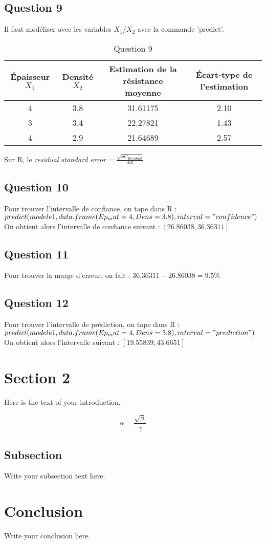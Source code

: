 \documentclass{article}
\begin{document}
\subsection{Question 9}
Il faut modéliser avec les variables \(X_{1}/X_{2}\) avec la commande 'predict'.
\begin{table}[!ht]
  \centering
  \footnotesize
  \begin{tabular}{cccc}\toprule
    \'Epaisseur $X_{1}$ & Densité $X_{2}$ & Estimation de la résistance moyenne & \'Ecart-type de l'estimation\\\midrule
    4 & 3.8 & 31.61175 & 2.10\\
    3 & 3.4 & 22.27821 & 1.43\\
    4 & 2.9 & 21.64689 & 2.57\\\bottomrule
  \end{tabular}
  \caption{Question 9}\label{tab:table}
\end{table}\newline
Sur R, le \textit{residual standard error} = $\frac{\sqrt{SC_{Residual}}}{ddl}$
\subsection{Question 10}
Pour trouver l'intervalle de confiance, on tape dans R :\newline
\textit{$predict(modele1, data.frame(Ep_mat = 4, Dens = 3.8), interval="confidence")$}\newline
On obtient alors l'intervalle de confiance suivant : $[26.86038, 36.36311]$
\subsection{Question 11}
Pour trouver la marge d'erreur, on fait : \(36.36311 - 26.86038 = 9.5\%\)
\subsection{Question 12}
Pour trouver l'intervalle de prédiction, on tape dans R :\newline
\textit{$predict(modele1, data.frame(Ep_mat = 4, Dens = 3.8), interval="prediction")$}\newline
On obtient alors l'intervalle suivant : \([19.55839, 43.6651]\)
\newpage
\section{Section 2}
Here is the text of your introduction.

\begin{equation}
    \label{simple_equation}
    \alpha = \frac{\sqrt{ \beta }}{\gamma}
\end{equation}

\subsection{Subsection}
Write your subsection text here.
\newpage
\section{Conclusion}
Write your conclusion here.
\end{document}

